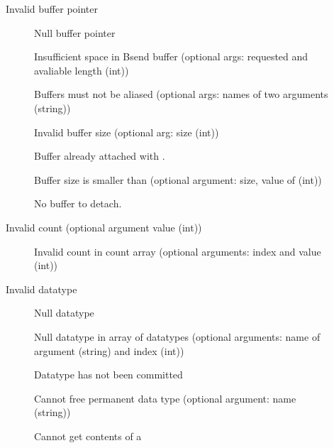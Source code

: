 \begin{description}
\item[]Invalid buffer pointer
    \begin{description}
    \item[]Null buffer pointer
    \item[]Insufficient space in Bsend
      buffer (optional args: requested and avaliable length (int))
    \item[]Buffers must not be aliased
      (optional args: names of two arguments (string))
    \item[]Invalid buffer size (optional arg:
      size (int))
    \item[]Buffer already attached with
      . 
    \item[]Buffer size is smaller than
       (optional argument: size, value of
       (int)) 
    \item[]No buffer to detach.
    \end{description}
\item[]Invalid count (optional argument value (int))
    \begin{description}
    \item[]Invalid count in count array
      (optional arguments: index and value (int))
    \end{description}
\item[]Invalid datatype
    \begin{description}
    \item[]Null datatype
    \item[]Null datatype in array of
      datatypes (optional arguments: name of argument (string) and index (int))
    \item[]Datatype has not been
      committed 
    \item[]Cannot free permanent data type
      (optional argument: name (string))
    \item[\mpidconst{MPIi_ERR_TYPE_PERM_CONTENTS]}]Cannot get contents of a

\end{description}
\end{description}
